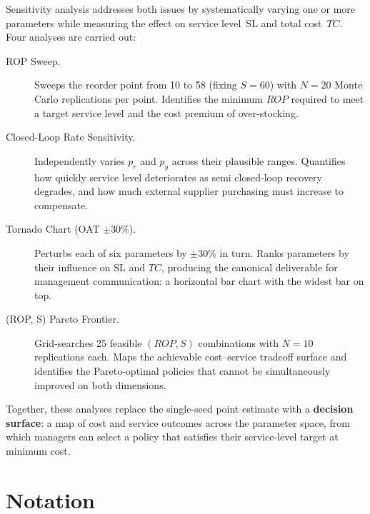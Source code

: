 \documentclass[11pt]{article}
\begin{document}
Sensitivity analysis addresses both issues by systematically varying one or more
parameters while measuring the effect on service level~$\mathrm{SL}$ and total
cost~$TC$.  Four analyses are carried out:

\begin{description}
  \item[ROP Sweep.] Sweeps the reorder point from 10 to 58 (fixing $S=60$) with
    $N=20$ Monte Carlo replications per point.  Identifies the minimum $ROP$
    required to meet a target service level and the cost premium of over-stocking.

  \item[Closed-Loop Rate Sensitivity.] Independently varies $p_r$ and $p_y$
    across their plausible ranges.  Quantifies how quickly service level
    deteriorates as semi closed-loop recovery degrades, and how much external supplier
    purchasing must increase to compensate.

  \item[Tornado Chart (OAT $\pm 30\%$).] Perturbs each of six parameters by
    $\pm 30\%$ in turn.  Ranks parameters by their influence on $\mathrm{SL}$
    and $TC$, producing the canonical deliverable for management communication:
    a horizontal bar chart with the widest bar on top.

  \item[(ROP, S) Pareto Frontier.] Grid-searches 25 feasible $(ROP, S)$
    combinations with $N=10$ replications each.  Maps the achievable
    cost--service tradeoff surface and identifies the Pareto-optimal policies
    that cannot be simultaneously improved on both dimensions.
\end{description}

Together, these analyses replace the single-seed point estimate with a
\textbf{decision surface}: a map of cost and service outcomes across the
parameter space, from which managers can select a policy that satisfies their
service-level target at minimum cost.

\section{Notation}
\end{document}
